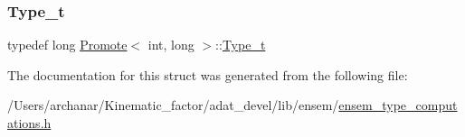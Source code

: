 \subsubsection{\texorpdfstring{Type\_t}{Type\_t}\hspace{0.1cm}{\footnotesize\ttfamily [2/2]}}
{\footnotesize\ttfamily typedef long \mbox{\hyperlink{structPromote}{Promote}}$<$ int, long $>$\+::\mbox{\hyperlink{structPromote_3_01int_00_01long_01_4_a91635f57c2365f0636c638aa4f311374}{Type\+\_\+t}}}



The documentation for this struct was generated from the following file\+:\begin{DoxyCompactItemize}
\item 
/\+Users/archanar/\+Kinematic\+\_\+factor/adat\+\_\+devel/lib/ensem/\mbox{\hyperlink{lib_2ensem_2ensem__type__computations_8h}{ensem\+\_\+type\+\_\+computations.\+h}}\end{DoxyCompactItemize}
